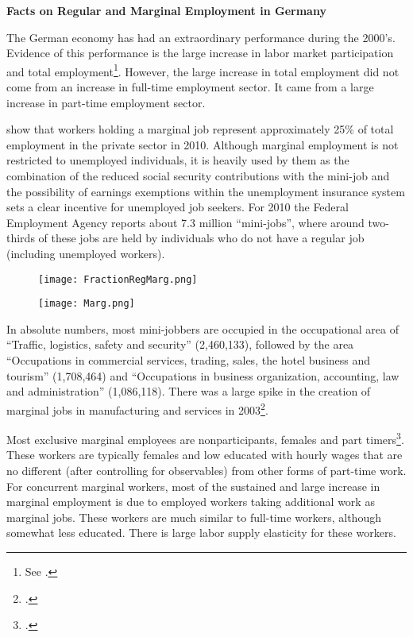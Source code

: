 \documentclass[12pt, a4paper]{article}
\begin{document}
\textbf{Facts on Regular and Marginal Employment in Germany}

The German economy has had an extraordinary performance during the 2000's. Evidence of this performance is the large increase in labor market participation and total employment\footnote{See \cite{BurdaHunt11}.}. However, the large increase in total employment did not come from an increase in full-time employment sector. It came from a large increase in part-time employment sector.

\cite{Galasi16} show that workers holding a marginal job represent approximately 25\% of total employment in the private sector in 2010.  Although marginal employment is not restricted to unemployed individuals, it is heavily used by them as the combination of the reduced social security contributions with the mini-job and the possibility of earnings exemptions within the unemployment insurance system sets a clear incentive for unemployed job seekers. For 2010 the Federal Employment Agency reports about 7.3 million “mini-jobs”, where around two-thirds of these jobs are held by individuals who do not have a regular job (including unemployed workers).

\begin{figure}[!h]
\captionsetup{font=large}
\centering
\caption{}
	\begin{minipage}[b]{0.45\textwidth} 
		\centering
		\label{fig:var_lc}
		\texttt{[image: FractionRegMarg.png]}
	\end{minipage}
	\begin{minipage}[b]{0.45\textwidth}
		\centering
		\label{fig:cond_var}
		\texttt{[image: Marg.png]}
	\end{minipage}
\end{figure}

In absolute numbers, most mini-jobbers are occupied in the occupational area of “Traffic, logistics, safety and security” (2,460,133), followed by the area “Occupations in commercial services, trading, sales, the hotel business and tourism” (1,708,464) and “Occupations in business organization, accounting, law and administration” (1,086,118). There was a large spike in the creation of marginal jobs in manufacturing and services in 2003\footnote{\cite{CarriTuRo15}.}.

Most exclusive marginal employees are nonparticipants, females and part timers\footnote{\cite{CarriTuRo15}.}. These workers are typically females and low educated with hourly wages that are no different (after controlling for observables) from other forms of part-time work. For concurrent marginal workers, most of the sustained and large increase in marginal employment is due to employed
workers taking additional work as marginal jobs. These workers are much similar to full-time workers, although somewhat less educated. There is large labor supply elasticity for these workers.
\end{document}
